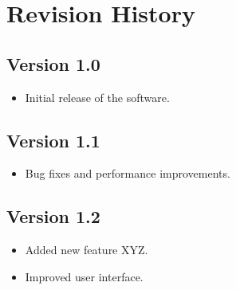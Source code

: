 
\section{Revision History}


\subsection{Version 1.0}
\begin{itemize}
    \item Initial release of the software.
\end{itemize}

\subsection{Version 1.1}
\begin{itemize}
    \item Bug fixes and performance improvements.
\end{itemize}

\subsection{Version 1.2}
\begin{itemize}
    \item Added new feature XYZ.
    \item Improved user interface.
\end{itemize}

